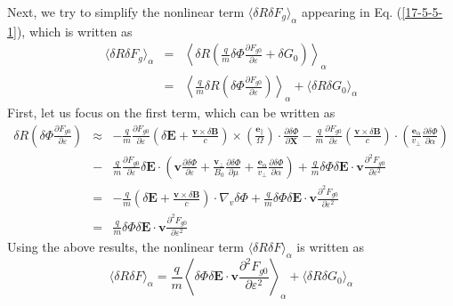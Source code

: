 \documentclass{article}
\newcommand{\tmmathbf}[1]{\ensuremath{\boldsymbol{#1}}}
\begin{document}
Next, we try to simplify the nonlinear term $\langle \delta R \delta F_g
\rangle_{\alpha}$ appearing in Eq. (\ref{17-5-5-1}), which is written as
\begin{eqnarray}
  \langle \delta R \delta F_g \rangle_{\alpha} & = & \left\langle \delta R
  \left( \frac{q}{m} \delta \Phi \frac{\partial F_{g 0}}{\partial \varepsilon}
  + \delta G_0 \right) \right\rangle_{\alpha} \nonumber\\
  & = & \left\langle \frac{q}{m} \delta R \left( \delta \Phi \frac{\partial
  F_{g 0}}{\partial \varepsilon} \right) \right\rangle_{\alpha} + \langle
  \delta R \delta G_0 \rangle_{\alpha} 
\end{eqnarray}
First, let us focus on the first term, which can be written as
\begin{eqnarray}
  \delta R \left( \delta \Phi \frac{\partial F_{g 0}}{\partial \varepsilon}
  \right) & \approx & - \frac{q}{m} \frac{\partial F_{g 0}}{\partial
  \varepsilon} \left( \delta \mathbf{E}+ \frac{\mathbf{v} \times \delta
  \mathbf{B}}{c} \right) \times \left( \frac{\tmmathbf{e}_{\parallel}}{\Omega}
  \right) \cdot \frac{\partial \delta \Phi}{\partial \mathbf{X}} -
  \frac{q}{m} \frac{\partial F_{g 0}}{\partial \varepsilon} \left(
  \frac{\mathbf{v} \times \delta \mathbf{B}}{c} \right) \cdot \left(
  \frac{\tmmathbf{e}_{\alpha}}{v_{\perp}}  \frac{\partial \delta
  \Phi}{\partial \alpha} \right) \nonumber\\
  & - & \frac{q}{m}  \frac{\partial F_{g 0}}{\partial \varepsilon} \delta
  \mathbf{E} \cdot \left( \mathbf{v} \frac{\partial \delta \Phi}{\partial
  \varepsilon} + \frac{\mathbf{v}_{\perp}}{B_0}  \frac{\partial \delta
  \Phi}{\partial \mu} + \frac{\tmmathbf{e}_{\alpha}}{v_{\perp}} 
  \frac{\partial \delta \Phi}{\partial \alpha} \right) + \frac{q}{m} \delta
  \Phi \delta \mathbf{E} \cdot \mathbf{v} \frac{\partial^2 F_{g 0}}{\partial
  \varepsilon^2} \nonumber\\
  & = & - \frac{q}{m} \left( \delta \mathbf{E}+ \frac{\mathbf{v} \times
  \delta \mathbf{B}}{c} \right) \cdot \nabla_v \delta \Phi + \frac{q}{m}
  \delta \Phi \delta \mathbf{E} \cdot \mathbf{v} \frac{\partial^2 F_{g
  0}}{\partial \varepsilon^2} \nonumber\\
  & = & \frac{q}{m} \delta \Phi \delta \mathbf{E} \cdot \mathbf{v}
  \frac{\partial^2 F_{g 0}}{\partial \varepsilon^2} 
\end{eqnarray}
Using the above results, the nonlinear term $\langle \delta R \delta F
\rangle_{\alpha}$ is written as
\begin{equation}
  \label{16-10-20-3} \langle \delta R \delta F \rangle_{\alpha} = \frac{q}{m}
  \left\langle \delta \Phi \delta \mathbf{E} \cdot \mathbf{v} \frac{\partial^2
  F_{g 0}}{\partial \varepsilon^2} \right\rangle_{\alpha} + \langle \delta R
  \delta G_0 \rangle_{\alpha}
\end{equation}
\end{document}
